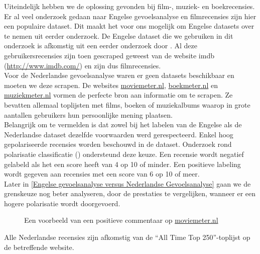 Uiteindelijk hebben we de oplossing gevonden bij film-, muziek- en boekrecensies. Er al veel onderzoek gedaan naar Engelse gevoelsanalyse en filmrecensies zijn hier een populaire dataset. Dit maakt het voor ons mogelijk om Engelse datasets over te nemen uit eerder onderzoek. De Engelse dataset die we gebruiken in dit onderzoek is afkomstig uit een eerder onderzoek door \cite{maas-EtAl:2011:ACL-HLT2011}. Al deze gebruikersrecensies zijn toen gescraped geweest van de website imdb (\url{http://www.imdb.com/}) en zijn dus filmrecensies.\\
Voor de Nederlandse gevoelsanalyse waren er geen datasets beschikbaar en moeten we deze scrapen. De websites \url{moviemeter.nl}, \url{boekmeter.nl} en \url{muziekmeter.nl} vormen de perfecte bron aan informatie om te scrapen. Ze bevatten allemaal toplijsten met films, boeken of muziekalbums waarop in grote aantallen gebruikers hun persoonlijke mening plaatsen.\\

Belangrijk om te vermelden is dat zowel bij het labelen van de Engelse als de Nederlandse dataset dezelfde voorwaarden werd gerespecteerd. Enkel hoog gepolariseerde recensies worden beschouwd in de dataset. Onderzoek rond polarisatie classificatie (\cite{maas-EtAl:2011:ACL-HLT2011}) ondersteund deze keuze. Een recensie wordt negatief gelabeld als het een score heeft van 4 op 10 of minder. Een positieve labeling wordt gegeven aan recensies met een score van 6 op 10 of meer.\\

Later in \ref{Engelse gevoelsanalyse versus Nederlandse Gevoelsanalyse} gaan we de grenskeuze  nog beter analyseren, door de prestaties te vergelijken, wanneer er een hogere polarisatie wordt doorgevoerd.

\begin{figure}[h]%
    \centering
    \caption{Een voorbeeld van een positieve commentaar op \url{moviemeter.nl}}%
\end{figure}
\newline

Alle Nederlandse recensies zijn afkomstig van de ``All Time Top 250''-toplijst op de betreffende website.

